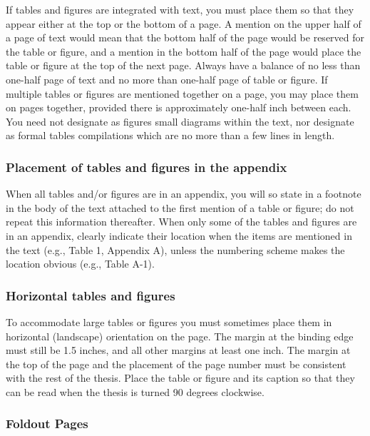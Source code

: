 If tables and figures are integrated with text, you must place them so
that they appear either at the top or the bottom of a page. A mention
on the upper half of a page of text would mean that the bottom half of
the page would be reserved for the table or figure, and a mention in
the bottom half of the page would place the table or figure at the top
of the next page. Always have a balance of no less than one-half page
of text and no more than one-half page of table or figure. If multiple
tables or figures are mentioned together on a page, you may place them
on pages together, provided there is approximately one-half inch
between each. You need not designate as figures small diagrams within
the text, nor designate as formal tables compilations which are no
more than a few lines in length.

\subsubsection{Placement of tables and figures in the appendix}
\label{sec:PlacementOfTablesAndFiguresInTheAppendix}

When all tables and/or figures are in an appendix, you will so state
in a footnote in the body of the text attached to the first mention of
a table or figure; do not repeat this information thereafter. When
only some of the tables and figures are in an appendix, clearly
indicate their location when the items are mentioned in the text
(e.g., Table 1, Appendix A), unless the numbering scheme makes the
location obvious (e.g., Table A-1).

\subsubsection{Horizontal tables and figures}
\label{sec:HorizontalTablesAndFigures}

To accommodate large tables or figures you must sometimes place them
in horizontal (landscape) orientation on the page. The margin at the
binding edge must still be 1.5 inches, and all other margins at least
one inch. The margin at the top of the page and the placement of the
page number must be consistent with the rest of the thesis. Place the
table or figure and its caption so that they can be read when the
thesis is turned 90 degrees clockwise.

\subsubsection{Foldout Pages}
\label{sec:FoldoutPages}

